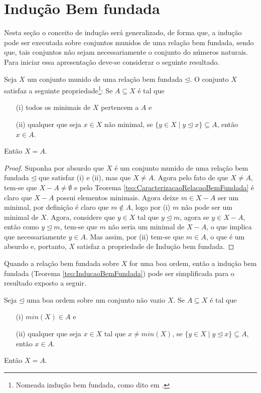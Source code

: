 \section{Indução Bem fundada}\label{sec:InducaoBoaOrdem}

Nesta seção o conceito de indução será generalizado, de forma que, a indução pode ser executada sobre conjuntos munidos de uma relação bem fundada, sendo que, tais conjuntos não sejam necessariamente o conjunto do números naturais. Para iniciar essa apresentação deve-se considerar o seguinte resultado.

\begin{teorema}\label{teo:InducaoBemFundada}
	Seja $X$ um conjunto munido de uma relação bem fundada $\unlhd$. O conjunto $X$ satisfaz a seguinte propriedade\footnote{Nomeada indução bem fundada, como dito em \cite{carmo2013}.}: Se $A \subseteq X$ é tal que
	\begin{itemize}
		\item[(i)] todos os minimais de $X$ pertencem a $A$ e
		\item[(ii)] qualquer que seja $x \in X$ não minimal, se $\{y \in X \mid y \unlhd x\} \subseteq A$, então $x \in A$.
	\end{itemize}
	Então $X = A$.
\end{teorema}

\begin{proof}
	Suponha por absurdo que $X$ é um conjunto munido de uma relação bem fundada $\unlhd$ que satisfaz (i) e (ii), mas que $X \neq A$. Agora pelo fato de que $X \neq A$, tem-se que $X - A \neq \emptyset$ e pelo Teorema \ref{teo:CaracterizacaoRelacaoBemFundada} é claro que $X - A$ possui elementos minimais. Agora deixe $m \in X - A$ ser um minimal, por definição é claro que $m \notin A$, logo por (i) $m$ não pode ser um minimal de $X$. Agora, considere que $y  \in X$ tal que $y \unlhd m$, agora se $y \in X - A$, então como $y \unlhd m$, tem-se que $m$ não seria um minimal de $X - A$, o que implica que necessariamente $y \in A$. Mas assim, por (ii) tem-se que $m \in A$, o que é um absurdo e, portanto, $X$ satisfaz a propriedade de Indução bem fundada.
\end{proof}

Quando a relação bem fundada sobre $X$ for uma boa ordem, então a indução bem fundada (Teorema \ref{teo:InducaoBemFundada}) pode ser simplificada para o resultado exposto a seguir.

\begin{corolario}
	Seja $\unlhd$ uma boa ordem sobre um conjunto não vazio $X$. Se $A \subseteq X$ é tal que
	\begin{itemize}
		\item[(i)] $min(X) \in A$ e
		\item[(ii)] qualquer que seja $x \in X$ tal que $x \neq min(X)$, se $\{y \in X \mid y \unlhd x\} \subseteq A$, então $x \in A$.
	\end{itemize}
	Então $X = A$.
\end{corolario}

